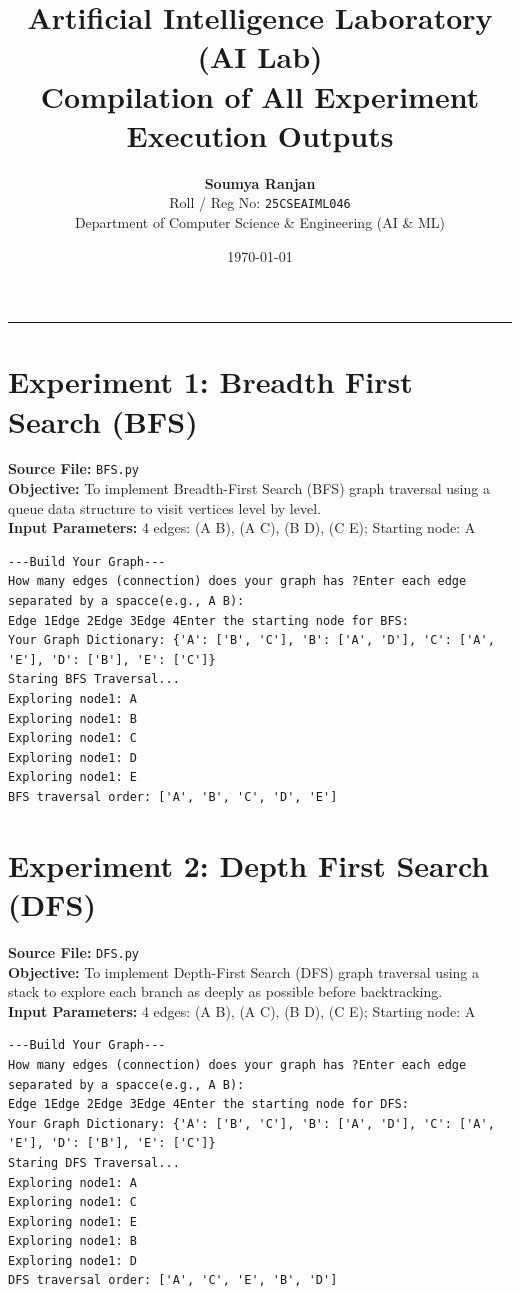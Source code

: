 \documentclass[11pt,a4paper]{article}
\title{\textbf{\LARGE Artificial Intelligence Laboratory (AI Lab)}\\
\Large Compilation of All Experiment Execution Outputs}
\author{\textbf{Soumya Ranjan} \\ Roll / Reg No: \texttt{25CSEAIML046} \\ Department of Computer Science \& Engineering (AI \& ML)}
\date{\today}
\begin{document}
\maketitle
\thispagestyle{fancy}
\hrule
\vspace{1em}

\tableofcontents
\newpage

\section{Experiment 1: Breadth First Search (BFS)}
\textbf{Source File:} \texttt{BFS.py} \\[4pt]
\textbf{Objective:} To implement Breadth-First Search (BFS) graph traversal using a queue data structure to visit vertices level by level. \\[4pt]
\textbf{Input Parameters:} 4 edges: (A B), (A C), (B D), (C E); Starting node: A \\[6pt]
\begin{tcolorbox}[colback=gray!5!white,colframe=blue!70!black,title={\textbf{Program Output: Breadth First Search (BFS)}}]
\begin{verbatim}
---Build Your Graph---
How many edges (connection) does your graph has ?Enter each edge separated by a spacce(e.g., A B):
Edge 1Edge 2Edge 3Edge 4Enter the starting node for BFS: 
Your Graph Dictionary: {'A': ['B', 'C'], 'B': ['A', 'D'], 'C': ['A', 'E'], 'D': ['B'], 'E': ['C']}
Staring BFS Traversal...
Exploring node1: A
Exploring node1: B
Exploring node1: C
Exploring node1: D
Exploring node1: E
BFS traversal order: ['A', 'B', 'C', 'D', 'E']
\end{verbatim}
\end{tcolorbox}
\vspace{1em}

\section{Experiment 2: Depth First Search (DFS)}
\textbf{Source File:} \texttt{DFS.py} \\[4pt]
\textbf{Objective:} To implement Depth-First Search (DFS) graph traversal using a stack to explore each branch as deeply as possible before backtracking. \\[4pt]
\textbf{Input Parameters:} 4 edges: (A B), (A C), (B D), (C E); Starting node: A \\[6pt]
\begin{tcolorbox}[colback=gray!5!white,colframe=blue!70!black,title={\textbf{Program Output: Depth First Search (DFS)}}]
\begin{verbatim}
---Build Your Graph---
How many edges (connection) does your graph has ?Enter each edge separated by a spacce(e.g., A B):
Edge 1Edge 2Edge 3Edge 4Enter the starting node for DFS: 
Your Graph Dictionary: {'A': ['B', 'C'], 'B': ['A', 'D'], 'C': ['A', 'E'], 'D': ['B'], 'E': ['C']}
Staring DFS Traversal...
Exploring node1: A
Exploring node1: C
Exploring node1: E
Exploring node1: B
Exploring node1: D
DFS traversal order: ['A', 'C', 'E', 'B', 'D']
\end{verbatim}
\end{tcolorbox}
\vspace{1em}
\end{document}
